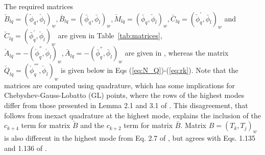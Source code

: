 \documentclass[preprint]{elsarticle}
\newcommand{\N}[1]{\check{#1}}
\newcommand{\D}[1]{\bar{#1}}
\begin{document}
The required matrices $ \N{B}_{lq} = ( \N{\phi}_q, 
\N{\phi}_l)_w, \D{B}_{lq} = ( \D{\phi}_q, 
\D{\phi}_l)_w 
, \N{M}_{lq} = ( \D{\phi}_q, 
\N{\phi}_l)_w, \D{C}_{lq} = (\N{\phi}_q^{'}, \D{\phi}_l)_w$ and 
$ \N{C}_{lq} = (\D{\phi}_q^{'}, \N{\phi}_l)_w$ are given in Table~\ref{tab:matrices}, $\N{A}_{lq} = -( \N{\phi}_q^{''}, 
\N{\phi}_l)_w, \D{A}_{lq} = -( \D{\phi}_q^{''}, \D{\phi}_l)_w$ are given in \cite{Shen95}, whereas the matrix $\N{Q}_{lq} = (\N{\phi}^{''''}_q, \N{\phi}_l)_w$ is given below in Eqs (\ref{eq:N_Q})-(\ref{eq:rk}). Note that the matrices are computed using quadrature, which has some implications for Chebyshev-Gauss-Lobatto (GL) points, where the rows of the highest modes differ from those presented in Lemma 2.1 and 3.1 of \cite{Shen95}. This disagreement, that follows from inexact quadrature at the highest mode, explains the inclusion of the $c_{k+4}$ term for matrix $\N{B}$ and the $c_{k+2}$ term for matrix $\D{B}$. Matrix $B=(T_k, T_j)_w$ is also different in the highest mode from Eq. 2.7 of \cite{Shen95}, but agrees with Eqs. 1.135 and 1.136 of \cite{kopriva09}.
\end{document}
